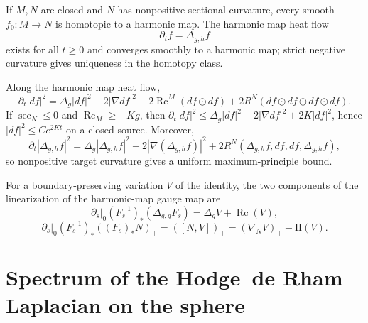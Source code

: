 \begin{theorem}
\label{thm:chow-iv-k17-eells-sampson}

If $M,N$ are closed and $N$ has nonpositive sectional curvature, every smooth
$f_0:M\to N$ is homotopic to a harmonic map.  The harmonic map heat flow
\[
\partial_tf=\Delta_{g,h}f
\]
exists for all $t\ge0$ and converges smoothly to a harmonic map; strict
negative curvature gives uniqueness in the homotopy class.
\end{theorem}

\begin{lemma}
\label{lem:chow-iv-k18-energy-density}


Along the harmonic map heat flow,
\[
\partial_t|df|^2=\Delta_g|df|^2-2|\nabla df|^2
-2\operatorname{Rc}^M(df\odot df)+2R^N(df\odot df\odot df\odot df).
\]
If $\sec_N\le0$ and $\operatorname{Rc}_M\ge-Kg$, then
$\partial_t|df|^2\le\Delta_g|df|^2-2|\nabla df|^2+2K|df|^2$, hence
$|df|^2\le Ce^{2Kt}$ on a closed source.  Moreover,
\[
\partial_t|\Delta_{g,h}f|^2
=\Delta_g|\Delta_{g,h}f|^2-2|\nabla(\Delta_{g,h}f)|^2
+2R^N(\Delta_{g,h}f,df,df,\Delta_{g,h}f),
\]
so nonpositive target curvature gives a uniform maximum-principle bound.
\end{lemma}

\begin{remark}
\label{rem:chow-iv-k-linearization-boundary}

For a boundary-preserving variation $V$ of the identity, the two components of
the linearization of the harmonic-map gauge map are
\[
\left.\partial_s\right|_0(F_s^{-1})_*(\Delta_{g,g}F_s)=\Delta_gV+\operatorname{Rc}(V),
\]
\[
\left.\partial_s\right|_0(F_s^{-1})_*((F_s)_*N)_\top
=([N,V])_\top=(\nabla_NV)_\top-\mathrm{II}(V).
\]
\end{remark}

\section{Spectrum of the Hodge--de Rham Laplacian on the sphere}

